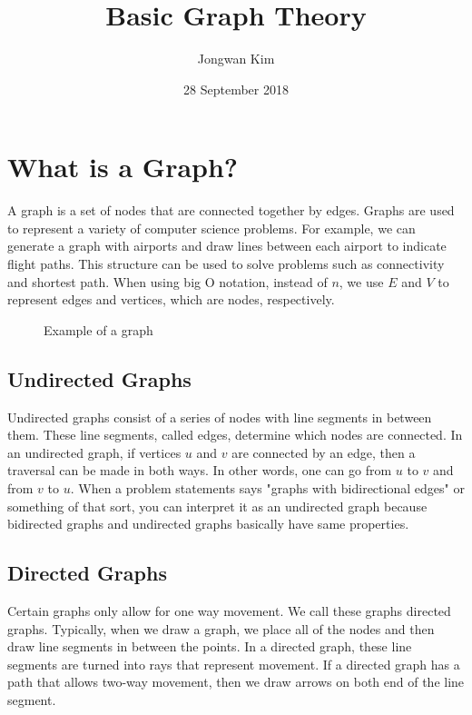 \documentclass{article}
\title{Basic Graph Theory}
\author{Jongwan Kim}
\date{28 September 2018}
\begin{document}
\maketitle

\section{What is a Graph?}
A graph is a set of nodes that are connected together by edges. Graphs are used to represent a variety of computer science problems. For example, we can generate a graph with airports and draw lines between each airport to indicate flight paths. This structure can be used to solve problems such as connectivity and shortest path. When using big O notation, instead of $n$, we use $E$ and $V$ to represent edges and vertices, which are nodes, respectively.

\begin{figure} [H]
    \begin{center}
    \end{center}
    \caption{Example of a graph}
\end{figure}

\subsection{Undirected Graphs}
Undirected graphs consist of a series of nodes with line segments in between them. These line segments, called edges, determine which nodes are connected. In an undirected graph, if vertices $u$ and $v$ are connected by an edge, then a traversal can be made in both ways. In other words, one can go from $u$ to $v$ and from $v$ to $u$. When a problem statements says "graphs with bidirectional edges" or something of that sort, you can interpret it as an undirected graph because bidirected graphs and undirected graphs basically have same properties.

\subsection{Directed Graphs}
Certain graphs only allow for one way movement. We call these graphs directed graphs. Typically, when we draw a graph, we place all of the nodes and then draw line segments in between the points. In a directed graph, these line segments are turned into rays that represent movement. If a directed graph has a path that allows two-way movement, then we draw arrows on both end of the line segment.
\end{document}

